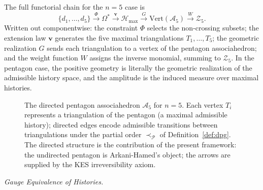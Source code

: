 \documentclass[11pt]{article}
\theoremstyle{plain}
\theoremstyle{definition}
\theoremstyle{remark}
\newcommand{\Phif}{\Phi}
\newcommand{\OmKS}{\Omega}
\newcommand{\Hmax}{\mathcal{H}_{\max}}
\begin{document}
The full functorial chain for the $n=5$ case is
\begin{equation}
\label{eq:composite-map}
  \{d_1,\ldots,d_5\} \xrightarrow{\Phif} \OmKS^* \xrightarrow{\mathbf{v}} \Hmax \xrightarrow{G} \mathrm{Vert}(\mathcal{A}_5) \xrightarrow{W} \mathcal{Z}_5.
\end{equation}
Written out componentwise: the constraint $\Phif$ selects the non-crossing subsets; the extension law $\mathbf{v}$ generates the five maximal triangulations $T_1, \ldots, T_5$; the geometric realization $G$ sends each triangulation to a vertex of the pentagon associahedron; and the weight function $W$ assigns the inverse monomial, summing to $\mathcal{Z}_5$. In the pentagon case, the positive geometry is literally the geometric realization of the admissible history space, and the amplitude is the induced measure over maximal histories.

\begin{figure}[H]
\centering
{}
\caption{The directed pentagon associahedron $\mathcal{A}_5$ for $n=5$.
Each vertex $T_i$ represents a triangulation of the pentagon (a maximal
admissible history); directed edges encode admissible transitions
between triangulations under the partial order $\prec_{\mathcal{P}}$
of Definition~\ref{def:dpg}. The directed structure is the contribution
of the present framework: the undirected pentagon is Arkani-Hamed's
object; the arrows are supplied by the KES irreversibility axiom.}
\end{figure}

\medskip\noindent\textit{Gauge Equivalence of Histories.}
\end{document}
